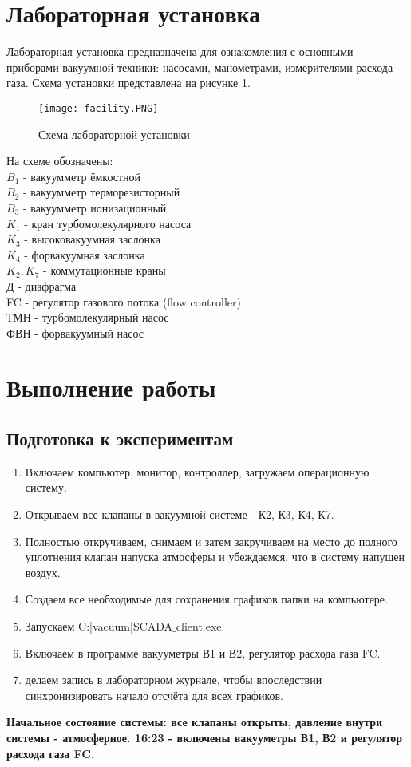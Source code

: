 \documentclass[a4paper]{article}
\begin{document}
\section{Лабораторная установка}

Лабораторная установка предназначена для ознакомления с основными приборами вакуумной техники: насосами, манометрами, измерителями расхода газа. Схема установки представлена на рисунке 1.
\begin{figure}[h]
    \centering
    \texttt{[image: facility.PNG]}
    \caption{Схема лабораторной установки}
    \label{fig:vac}
\end{figure}

На схеме обозначены: \\
$B_1$ - вакуумметр ёмкостной\\
$B_2$ - вакуумметр терморезисторный\\
$B_3$ - вакуумметр ионизационный\\
$K_1$ - кран турбомолекулярного насоса\\
$K_3$ - высоковакуумная заслонка\\
$K_4$ - форвакуумная заслонка\\
$K_2, K_7$ - коммутационные краны\\
Д - диафрагма\\
FC - регулятор газового потока (flow controller)\\
ТМН - турбомолекулярный насос\\
ФВН - форвакуумный насос\\

\section{Выполнение работы}
\subsection{Подготовка к экспериментам}
\begin{enumerate}
    \item Включаем компьютер, монитор, контроллер, загружаем операционную систему.
    \item Открываем все клапаны в вакуумной системе - К2, К3, К4, К7.
    \item Полностью откручиваем, снимаем и затем закручиваем на место до полного уплотнения клапан напуска атмосферы и убеждаемся, что в систему напущен воздух.
    \item Создаем все необходимые для сохранения графиков папки на компьютере.
    \item Запускаем C:|vacuum|SCADA$\_$client.exe.
    \item Включаем в программе вакууметры В1 и В2, регулятор расхода газа FC.
    \item делаем запись в лабораторном журнале, чтобы впоследствии синхронизировать начало отсчёта для всех графиков.
\end{enumerate}
\textbf{ Начальное состояние системы: все клапаны открыты, давление внутри системы - атмосферное. 16:23 - включены вакууметры В1, В2 и регулятор расхода газа FC.}\\
\end{document}

